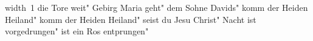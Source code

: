 \ifx\mxversion\undefined
  
  
  
  
\fi

%
\hbox{\pdfximage width 1\pdfrefximage\pdflastximage}\vfill\eject
\tableofcontents
\normalmusicsize
 die Tore weit"
 Gebirg Maria geht"
 dem Sohne Davids"
 komm der Heiden Heiland"
 komm der Heiden Heiland"
 seist du Jesu Christ"
 Nacht ist vorgedrungen"
 ist ein Ros entprungen"
\bookbye
